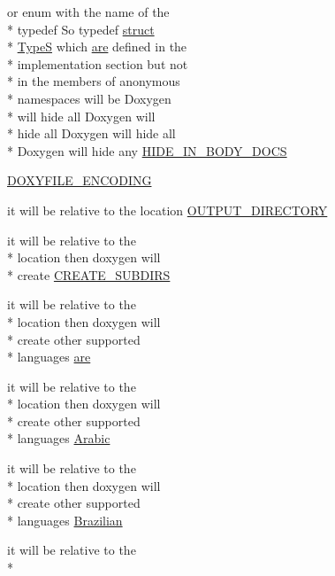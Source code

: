 \begin{DoxyCompactItemize}
or enum with the name of the \\*
typedef So typedef \hyperlink{mkdoc_8dox_aba655c5729da86df745f0c8e7f9ba8d2}{struct} \\*
\hyperlink{mkdoc_8dox_a25dd1c015abaf1e4f2c6879012f4f170}{Type\-S} which \hyperlink{mkdoc_8dox_a6d0965b20c4eb2235e8f9f5f0e5193ae}{are} defined in the \\*
implementation section but not \\*
in the members of anonymous \\*
namespaces will be Doxygen \\*
will hide all Doxygen will \\*
hide all Doxygen will hide all \\*
Doxygen will hide any \hyperlink{mkdoc_8dox_aac21372812b1ce4b2d16b5121c56fff6}{H\-I\-D\-E\-\_\-\-I\-N\-\_\-\-B\-O\-D\-Y\-\_\-\-D\-O\-C\-S}
\item 
\hyperlink{mkdoc_8dox_ac50780facdab5a469895066bc087eea5}{D\-O\-X\-Y\-F\-I\-L\-E\-\_\-\-E\-N\-C\-O\-D\-I\-N\-G}
\item 
it will be relative to the location \hyperlink{mkdoc_8dox_a0210526ada4ed067410fb4f078b8ae3f}{O\-U\-T\-P\-U\-T\-\_\-\-D\-I\-R\-E\-C\-T\-O\-R\-Y}
\item 
it will be relative to the \\*
location then doxygen will \\*
create \hyperlink{mkdoc_8dox_a77f3c876623f3cbb5ed96ca49ce6fe06}{C\-R\-E\-A\-T\-E\-\_\-\-S\-U\-B\-D\-I\-R\-S}
\item 
it will be relative to the \\*
location then doxygen will \\*
create other supported \\*
languages \hyperlink{mkdoc_8dox_a6d0965b20c4eb2235e8f9f5f0e5193ae}{are}
\item 
it will be relative to the \\*
location then doxygen will \\*
create other supported \\*
languages \hyperlink{mkdoc_8dox_a09569d1a0354f8f4cabb5f3633abc16b}{Arabic}
\item 
it will be relative to the \\*
location then doxygen will \\*
create other supported \\*
languages \hyperlink{mkdoc_8dox_a8e7728ba488d59bc2d1023e8f1325f11}{Brazilian}
\item 
it will be relative to the \\*

\end{DoxyCompactItemize}
